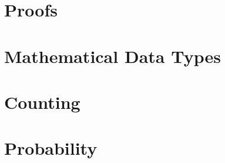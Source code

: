 \documentclass{mcs}
\begin{document}
\frontmatter

%

\mainmatter



\part{Proofs}







\part{Mathematical Data Types}







\part{Counting}





\part{Probability}









\end{document}

